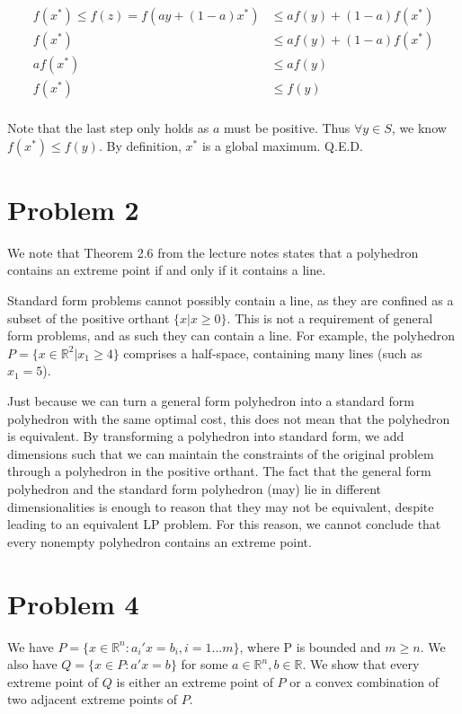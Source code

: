 \documentclass[11pt]{article}
\begin{document}
\begin{equation}
\begin{split}
f(x^*)\leq f(z) = f(ay + (1-a)x^*) &\leq af(y) + (1-a) f(x^*)\\
f(x^*) &\leq af(y) + (1-a) f(x^*) \\
af(x^*) &\leq af(y) \\
f(x^*) &\leq f(y) \\
\end{split}
\end{equation}

Note that the last step only holds as $a$ must be positive. Thus $\forall y\in S$, we know $f(x^*)\leq f(y)$. By definition, $x^*$ is a global maximum. Q.E.D. 

\section*{Problem 2}

We note that Theorem 2.6 from the lecture notes states that a polyhedron contains an extreme point if and only if it contains a line.

Standard form problems cannot possibly contain a line, as they are confined as a subset of the positive orthant $\{x|x\geq 0\}$. This is not a requirement of general form problems, and as such they can contain a line. For example, the polyhedron $P=\{x\in\mathbb{R}^2|x_1\geq 4\}$ comprises a half-space, containing many lines (such as $x_1=5$).

Just because we can turn a general form polyhedron into a standard form polyhedron with the same optimal cost, this does not mean that the polyhedron is equivalent. By transforming a polyhedron into standard form, we add dimensions such that we can maintain the constraints of the original problem through a polyhedron in the positive orthant. The fact that the general form polyhedron and the standard form polyhedron (may) lie in different dimensionalities is enough to reason that they may not be equivalent, despite leading to an equivalent LP problem. For this reason, we cannot conclude that every nonempty polyhedron contains an extreme point.

\section*{Problem 4}

We have $P=\{x\in\mathbb{R}^n: a_i'x=b_i, i=1...m\}$, where P is bounded and $m\geq n$. We also have $Q=\{x\in P: a'x=b\}$ for some $a\in\mathbb{R}^n, b\in\mathbb{R}$. We show that every extreme point of $Q$ is either an extreme point of $P$ or a convex combination of two adjacent extreme points of $P$.\\
\end{document}

